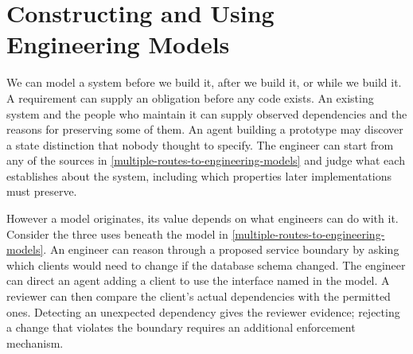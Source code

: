 


\chapter{Constructing and Using Engineering Models}



We can model a system before we build it, after we build it, or while we build it. A requirement can supply an obligation before any code exists. An existing system and the people who maintain it can supply observed dependencies and the reasons for preserving some of them. An agent building a prototype may discover a state distinction that nobody thought to specify. The engineer can start from any of the sources in \autoref{multiple-routes-to-engineering-models} and judge what each establishes about the system, including which properties later implementations must preserve.


However a model originates, its value depends on what engineers can do with it. Consider the three uses beneath the model in \autoref{multiple-routes-to-engineering-models}. An engineer can reason through a proposed service boundary by asking which clients would need to change if the database schema changed. The engineer can direct an agent adding a client to use the interface named in the model. A reviewer can then compare the client's actual dependencies with the permitted ones. Detecting an unexpected dependency gives the reviewer evidence; rejecting a change that violates the boundary requires an additional enforcement mechanism.

